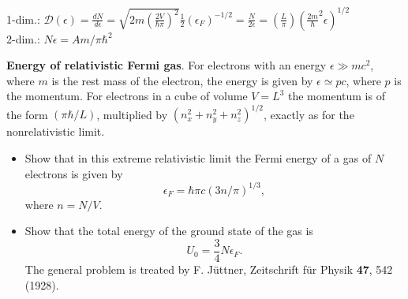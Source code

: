 1-dim.: $\mathcal{D}(\epsilon) = \frac{dN}{d\epsilon} = \sqrt{ 2m \left( \frac{2V}{ \hbar \pi }\right)^2 } \frac{1}{2} (\epsilon_F)^{-1/2} = \frac{N}{2 \epsilon } = \left( \frac{L}{\pi} \right) \left( \frac{2m} \hbar^2 \epsilon \right)^{1/2}$ \\
2-dim.: $N \epsilon = Am/ \pi \hbar^2$  


 \textbf{Energy of relativistic Fermi gas}.  For electrons with an energy $\epsilon \gg mc^2$, where $m$ is the rest mass of the electron, the energy is given by $\epsilon \simeq pc$, where $p$ is the momentum.  For electrons in a cube of volume $V = L^3$ the momentum is of the form $(\pi \hbar /L)$, multiplied by $(n_x^2 + n_y^2 + n_z^2)^{1/2}$, exactly as for the nonrelativistic limit.  \begin{itemize} \item[(a)] Show that in this extreme relativistic limit the Fermi energy of a gas of $N$ electrons is given by
\begin{equation}
  \epsilon_F = \hbar \pi c (3 n/\pi)^{1/3},
\end{equation}
where $n=N/V$.  \item[(b)] Show that the total energy of the ground state of the gas is 
\begin{equation}
  U_0 = \frac{3}{4} N \epsilon_F.
\end{equation}
The general problem is treated by F. J\"{u}ttner, Zeitschrift f\"{u}r Physik \textbf{47}, 542 (1928).  
\end{itemize}

